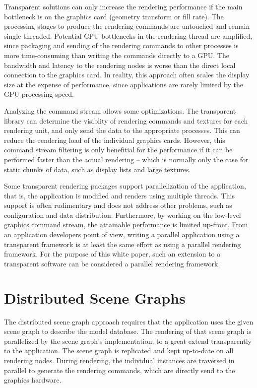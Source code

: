 \documentclass[10pt,a4paper]{scrartcl}
\begin{document}
Transparent solutions can only increase the rendering performance if the
main bottleneck is on the graphics card (geometry transform or fill rate). The
processing stages to produce the rendering commands are untouched and
remain single-threaded. Potential CPU bottlenecks in the rendering
thread are amplified, since packaging and sending of the rendering
commands to other processes is more time-consuming than writing the
commands directly to a GPU. The bandwidth and latency to the rendering
nodes is worse than the direct local connection to the graphics card. In
reality, this approach often scales the display size at the expense of
performance, since applications are rarely limited by the GPU
processing speed.

Analyzing the command stream allows some optimizations. The transparent
library can determine the visiblity of rendering commands and textures for each
rendering unit, and only send the data to the appropriate processes.
This can reduce the rendering load of the individual graphics
cards. However, this command stream filtering is only benefitial for the
performance if it can be performed faster than the actual rendering --
which is normally only the case for static chunks of data, such as display
lists and large textures. %

Some transparent rendering packages support parallelization of the
application, that is, the application is modified and renders using
multiple threads. This support is often rudimentary and does not address other
problems, such as configuration and data distribution. Furthermore, by
working on the low-level graphics command stream, the attainable
performance is limited up-front. From an application developers point of
view, writing a parallel application using a transparent framework is at
least the same effort as using a parallel rendering framework. For the
purpose of this white paper, such an extension to a transparent software
can be considered a parallel rendering framework.

\section{Distributed Scene Graphs}
The distributed scene graph approach requires that the application uses
the given scene graph to describe the model database. The rendering of
that scene graph is parallelized by the scene graph's implementation, to
a great extend transparently to the application. The scene graph is
replicated and kept up-to-date on all rendering nodes. During rendering,
the individual instances are traversed in parallel to generate the
rendering commands, which are directly send to the graphics hardware.
\end{document}
